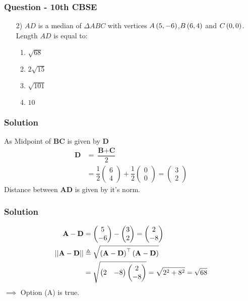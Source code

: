 \documentclass{beamer}
\begin{document}
\begin{frame}
\frametitle{Question - 10th CBSE}
\begin{enumerate}
\item [2)]
$AD$ is a median of $\Delta ABC$ with vertices $A\left(5,-6\right)$,$B\left(6,4\right)$ and $C\left(0,0\right)$. Length $AD$ is equal to:
\begin{enumerate}
\item $\sqrt{68}$
\item $2\sqrt{15}$
\item $\sqrt{101}$
\item $10$
\end{enumerate}
\end{enumerate}
\end{frame}



\begin{frame}
\frametitle{Solution}
As Midpoint of $\textbf{BC}$ is given by $\textbf{D}$
\begin{align}
    \textbf{D} &= \dfrac{\textbf{B} + \textbf{C}}{2}\\
    &=\dfrac{1}{2}\begin{pmatrix}
        6\\
        4
    \end{pmatrix}
    +
   \dfrac{1}{2} \begin{pmatrix}
        0\\
        0
    \end{pmatrix} = \begin{pmatrix}
        3\\
        2
    \end{pmatrix}
\end{align}
Distance between $\textbf{AD}$ is given by it's norm.
\end{frame}

\begin{frame}
\frametitle{Solution}
\begin{align}
\textbf{A}-\textbf{D} &= \begin{pmatrix}
        5\\
        -6
    \end{pmatrix}-\begin{pmatrix}
        3\\
        2
    \end{pmatrix}=
    \begin{pmatrix}
        2\\
        -8
    \end{pmatrix}
\\    \lvert\lvert \textbf{A}-\textbf{D} \rvert\rvert &\triangleq \sqrt{\left(\textbf{A}-\textbf{D}\right)^\top\left(\textbf{A}-\textbf{D}\right)} \label{9}\\
    &= \sqrt{\begin{pmatrix}
        2 & -8 
    \end{pmatrix}
    \begin{pmatrix}
        2\\
        -8
    \end{pmatrix}}
    = \sqrt{2^2+8^2} =\sqrt{68} 
\end{align}
$\implies$ Option (A) is true.
\end{frame}
\end{document}
